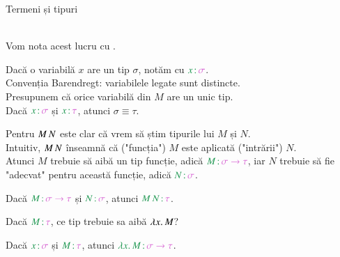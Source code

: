 \documentclass[xcolor=pdftex,romanian,colorlinks]{beamer}
\begin{document}
\begin{frame}{Termeni și tipuri}

 \\
Vom nota acest lucru cu .

\pause
\smallskip
{} Dacă o variabilă $x$ are un tip $\sigma$, notăm cu \alert{$\type{x}{\sigma}$}. \\
	\alert{Convenția Barendregt:} variabilele legate sunt distincte.\\
	Presupunem că \alert{orice variabilă din $M$ are un unic tip}. \\
	Dacă $\type{x}{\sigma}$ și $\type{x}{\tau}$, atunci $\sigma \equiv \tau$.

\pause
\smallskip
{} Pentru $M\, N$ este clar că vrem să știm tipurile lui $M$ și $N$. \\
Intuitiv, $M\, N$ înseamnă că ("funcția") $M$ este aplicată ("intrării") $N$. \\
Atunci $M$ trebuie să aibă un tip funcție, adică $\type{M}{\sigma \to \tau}$, iar $N$ trebuie să fie "adecvat" pentru această funcție, adică $\type{N}{\sigma}$.
\vspace{-.2cm}
\begin{center}
Dacă $\type{M}{\sigma \to \tau}$ și $\type{N}{\sigma}$, atunci $\type{\app{M}{N}}{\tau}$.
\end{center}

\pause
\smallskip
{} Dacă $\type{M}{\tau}$, ce tip trebuie sa aibă $\lambda x.\,M$?\\
\vspace{-.2cm}
\begin{center}
Dacă $\type{x}{\sigma}$ și $\type{M}{\tau}$, atunci $\type{\abs{x}{M}}{\sigma \to \tau}$.
\end{center}


\end{frame}
\end{document}
